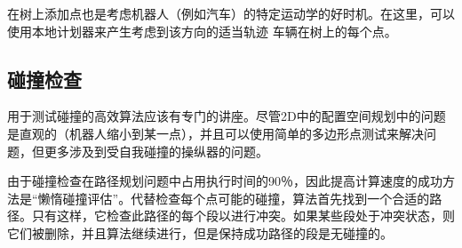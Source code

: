 在树上添加点也是考虑机器人（例如汽车）的特定运动学的好时机。在这里，可以使用本地计划器来产生考虑到该方向的适当轨迹
车辆在树上的每个点。


\subsection{碰撞检查}
用于测试碰撞的高效算法应该有专门的讲座。尽管2D中的配置空间规划中的问题是直观的（机器人缩小到某一点），并且可以使用简单的多边形点测试来解决问题，但更多涉及到受自我碰撞的操纵器的问题。


由于碰撞检查在路径规划问题中占用执行时间的90％，因此提高计算速度的成功方法是“懒惰碰撞评估”。代替检查每个点可能的碰撞，算法首先找到一个合适的路径。只有这样，它检查此路径的每个段以进行冲突。如果某些段处于冲突状态，则它们被删除，并且算法继续进行，但是保持成功路径的段是无碰撞的。


